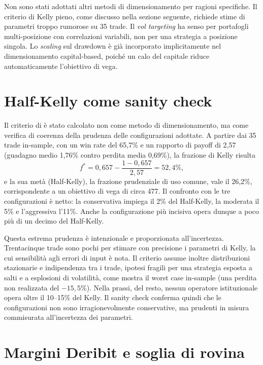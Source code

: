Non sono stati adottati altri metodi di dimensionamento per ragioni
specifiche. Il criterio di Kelly pieno, come discusso nella sezione
seguente, richiede stime di parametri troppo rumorose su 35 trade. Il
\emph{vol targeting} ha senso per portafogli multi-posizione con
correlazioni variabili, non per una strategia a posizione singola. Lo
\emph{scaling} sul drawdown è già incorporato implicitamente nel
dimensionamento capital-based, poiché un calo del capitale riduce
automaticamente l'obiettivo di vega.

\section{Half-Kelly come sanity check}
\label{sec:mm-kelly}

Il criterio di \citet{kelly1956new} è stato calcolato non come metodo di
dimensionamento, ma come verifica di coerenza della prudenza delle
configurazioni adottate. A partire dai 35 trade in-sample, con un win rate
del 65,7\% e un rapporto di payoff di 2,57 (guadagno medio 1,76\% contro
perdita media 0,69\%), la frazione di Kelly risulta
%
\begin{equation}
f^{*} = 0{,}657 - \frac{1 - 0{,}657}{2{,}57} = 52{,}4\%,
\end{equation}
%
e la sua metà (Half-Kelly), la frazione prudenziale di uso comune, vale il
26,2\%, corrispondente a un obiettivo di vega di circa 477. Il confronto con
le tre configurazioni è netto: la conservativa impiega il 2\% del
Half-Kelly, la moderata il 5\% e l'aggressiva l'11\%. Anche la
configurazione più incisiva opera dunque a poco più di un decimo del
Half-Kelly.

Questa estrema prudenza è intenzionale e proporzionata all'incertezza.
Trentacinque trade sono pochi per stimare con precisione i parametri di
Kelly, la cui sensibilità agli errori di input è nota. Il criterio assume
inoltre distribuzioni stazionarie e indipendenza tra i trade, ipotesi
fragili per una strategia esposta a salti e a esplosioni di volatilità, come
mostra il worst case in-sample (una perdita non realizzata del $-15{,}5\%$).
Nella prassi, del resto, nessun operatore istituzionale opera oltre il
10--15\% del Kelly. Il sanity check conferma quindi che le configurazioni
non sono irragionevolmente conservative, ma prudenti in misura commisurata
all'incertezza dei parametri.

\section{Margini Deribit e soglia di rovina}
\label{sec:mm-margini}

